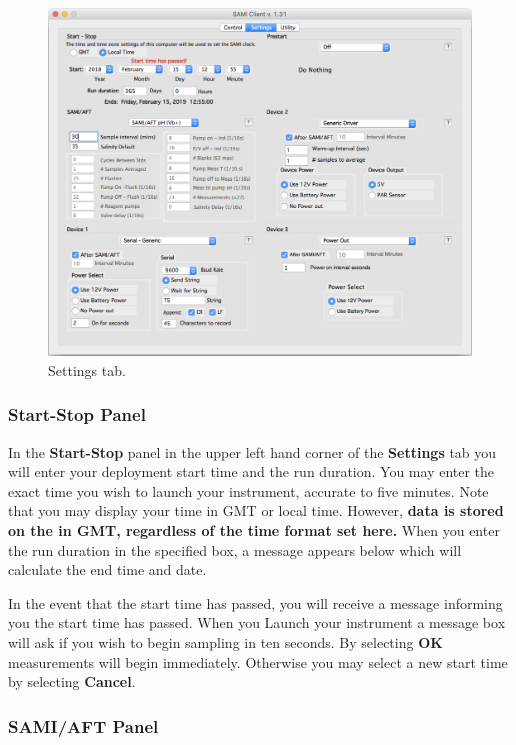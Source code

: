 \begin{figure}[h]
\centering
\includegraphics[width=1.0\textwidth]{figs/Set_Tab2.png}
\caption{Settings tab.}
\label{fig:SetTab2}
\end{figure}


\subsubsection{Start-Stop Panel}

In the \textbf{Start-Stop} panel in the upper left hand corner of the \textbf{Settings} tab you will enter your deployment start time and the run duration. You may enter the exact time you wish to launch your instrument, accurate to five minutes. Note that you may display your time in GMT or local time. However, \textbf{data is stored on the \instType{} in GMT, regardless of the time format set here.} When you enter the run duration in the specified box, a message appears below which will calculate the end time and date. 

In the event that the start time has passed, you will receive a message informing you the start time has passed. When you Launch your instrument a message box will ask if you wish to begin sampling in ten seconds.  By selecting \textbf{OK} measurements will begin immediately. Otherwise you may select a new start time by selecting \textbf{Cancel}.


\subsubsection{SAMI/AFT Panel}

